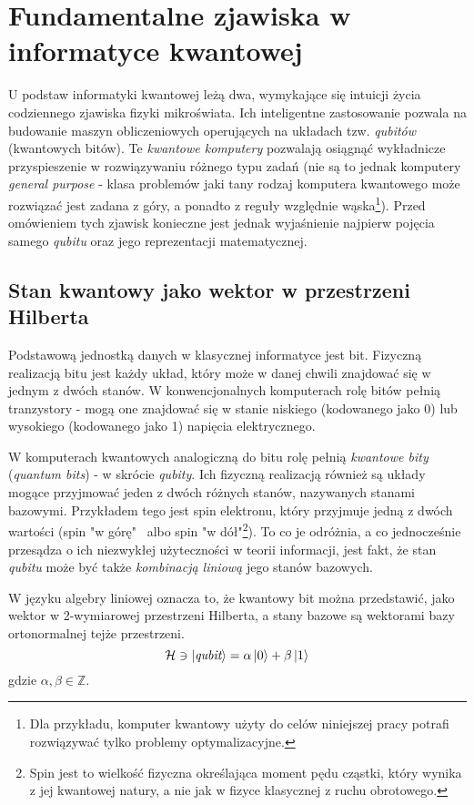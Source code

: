 \documentclass[12pt,a4paper,twoside,openany]{book}
\begin{document}
\section{Fundamentalne zjawiska w informatyce kwantowej}

U podstaw informatyki kwantowej leżą dwa, wymykające się intuicji życia codziennego zjawiska fizyki mikroświata. Ich inteligentne zastosowanie pozwala na budowanie maszyn obliczeniowych operujących na układach tzw. \textit{qubitów} (kwantowych bitów). Te \textit{kwantowe komputery} pozwalają osiągnąć wykładnicze przyspieszenie w rozwiązywaniu różnego typu zadań (nie są to jednak komputery \textit{general purpose} - klasa problemów jaki tany rodzaj komputera kwantowego może rozwiązać jest zadana z góry, a ponadto z reguły względnie wąska\footnote{Dla przykładu, komputer kwantowy użyty do celów niniejszej pracy potrafi rozwiązywać tylko problemy optymalizacyjne.}).
Przed omówieniem tych zjawisk konieczne jest jednak wyjaśnienie najpierw pojęcia samego \textit{qubitu} oraz jego reprezentacji matematycznej.

\subsection{Stan kwantowy jako wektor w przestrzeni Hilberta}

Podstawową jednostką danych w klasycznej informatyce jest bit. Fizyczną realizacją bitu jest każdy układ, który może w danej chwili znajdować się w jednym z dwóch stanów. W konwencjonalnych komputerach rolę bitów pełnią tranzystory - mogą one znajdować się w stanie niskiego (kodowanego jako 0) lub wysokiego (kodowanego jako 1) napięcia elektrycznego.

W komputerach kwantowych analogiczną do bitu rolę pełnią \textit{kwantowe bity} (\textit{quantum bits}) - w skrócie \textit{qubity}. Ich fizyczną realizacją również są układy mogące przyjmować jeden z dwóch różnych stanów, nazywanych stanami bazowymi. Przykładem tego jest spin elektronu, który przyjmuje jedną z dwóch wartości (spin "w górę" ~albo spin "w dół"\footnote{Spin jest to wielkość fizyczna określająca moment pędu cząstki, który wynika z jej kwantowej natury, a nie jak w fizyce klasycznej z ruchu obrotowego.}). To co je odróżnia, a co jednocześnie przesądza o ich niezwykłej użyteczności w teorii informacji, jest fakt, że stan \textit{qubitu} może być także \textit{kombinacją liniową} jego stanów bazowych.

W języku algebry liniowej oznacza to, że kwantowy bit można przedstawić, jako wektor w 2-wymiarowej przestrzeni Hilberta, a stany bazowe są wektorami bazy ortonormalnej tejże przestrzeni.
\begin{equation}
    \mathcal{H} \ni \ket{\textit{qubit}} = \alpha\ket{0} + \beta\ket{1}
\end{equation}
gdzie $\alpha, \beta \in \mathbb{Z}$.
\end{document}
